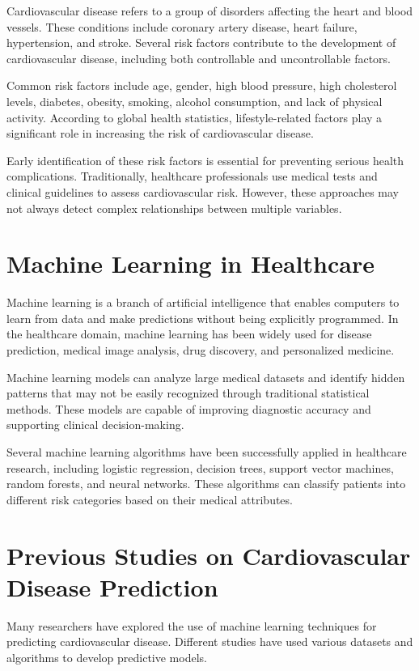 Cardiovascular disease refers to a group of disorders affecting the heart and blood vessels. These conditions include coronary artery disease, heart failure, hypertension, and stroke. Several risk factors contribute to the development of cardiovascular disease, including both controllable and uncontrollable factors.

Common risk factors include age, gender, high blood pressure, high cholesterol levels, diabetes, obesity, smoking, alcohol consumption, and lack of physical activity. According to global health statistics, lifestyle-related factors play a significant role in increasing the risk of cardiovascular disease.

Early identification of these risk factors is essential for preventing serious health complications. Traditionally, healthcare professionals use medical tests and clinical guidelines to assess cardiovascular risk. However, these approaches may not always detect complex relationships between multiple variables.

\section{Machine Learning in Healthcare}

Machine learning is a branch of artificial intelligence that enables computers to learn from data and make predictions without being explicitly programmed. In the healthcare domain, machine learning has been widely used for disease prediction, medical image analysis, drug discovery, and personalized medicine.

Machine learning models can analyze large medical datasets and identify hidden patterns that may not be easily recognized through traditional statistical methods. These models are capable of improving diagnostic accuracy and supporting clinical decision-making.

Several machine learning algorithms have been successfully applied in healthcare research, including logistic regression, decision trees, support vector machines, random forests, and neural networks. These algorithms can classify patients into different risk categories based on their medical attributes.

\section{Previous Studies on Cardiovascular Disease Prediction}

Many researchers have explored the use of machine learning techniques for predicting cardiovascular disease. Different studies have used various datasets and algorithms to develop predictive models.

